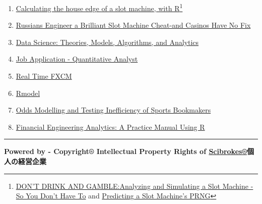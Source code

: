 \documentclass[]{book}
\providecommand{\tightlist}{%
  \setlength{\itemsep}{0pt}\setlength{\parskip}{0pt}}
\let\rmarkdownfootnote\footnote%
\def\footnote{\protect\rmarkdownfootnote}
\theoremstyle{definition}
\theoremstyle{definition}
\theoremstyle{definition}
\theoremstyle{remark}
\begin{document}
\begin{enumerate}
\def\labelenumi{\arabic{enumi}.}
\tightlist
\item
  \href{https://www.r-bloggers.com/calculating-the-house-edge-of-a-slot-machine-with-r/}{Calculating
  the house edge of a slot machine, with R}\footnote{\href{http://giorasimchoni.com/2017/05/06/2017-05-06-don-t-drink-and-gamble/}{DON'T
    DRINK AND GAMBLE:Analyzing and Simulating a Slot Machine - So You
    Don't Have To} and
    \href{https://www.schneier.com/blog/archives/2017/02/predicting_a_sl.html}{Predicting
    a Slot Machine's PRNG}}
\item
  \href{https://www.wired.com/2017/02/russians-engineer-brilliant-slot-machine-cheat-casinos-no-fix/}{Russians
  Engineer a Brilliant Slot Machine Cheat-and Casinos Have No Fix}
\item
  \href{https://srdas.github.io/MLBook}{Data Science: Theories, Models,
  Algorithms, and Analytics}
\item
  \href{github.com/englianhu/binary.com-interview-question}{Job
  Application - Quantitative Analyst}
\item
  \href{https://github.com/scibrokes/real-time-fxcm}{Real Time FXCM}
\item
  \href{https://github.com/scibrokes/Rmodel}{Rmodel}
\item
  \href{https://github.com/scibrokes/odds-modelling-and-testing-inefficiency-of-sports-bookmakers}{Odds
  Modelling and Testing Inefficiency of Sports Bookmakers}
\item
  \href{https://bookdown.org/wfoote01/faur/}{Financial Engineering
  Analytics: A Practice Manual Using R}
\end{enumerate}

\begin{center}\rule{0.5\linewidth}{\linethickness}\end{center}

\textbf{Powered by - Copyright® Intellectual Property Rights of
\href{http://www.scibrokes.com}{Scibrokes®}個人の経営企業}


\end{document}
